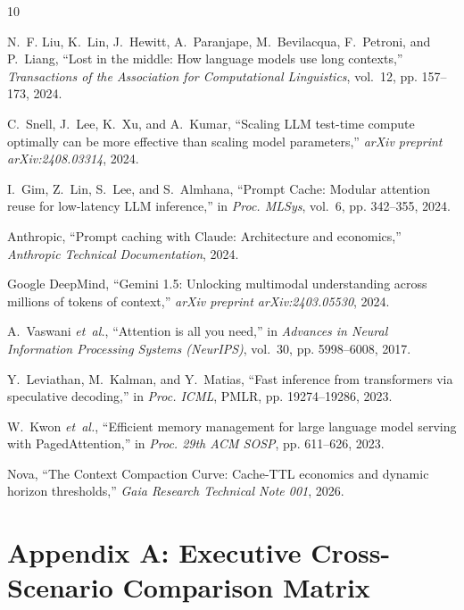\documentclass[10pt,twocolumn,a4paper]{article}
\begin{document}
\begin{thebibliography}{10}

N.~F. Liu, K.~Lin, J.~Hewitt, A.~Paranjape, M.~Bevilacqua, F.~Petroni, and P.~Liang,
``Lost in the middle: How language models use long contexts,''
\emph{Transactions of the Association for Computational Linguistics}, vol.~12, pp. 157--173, 2024.

C.~Snell, J.~Lee, K.~Xu, and A.~Kumar,
``Scaling LLM test-time compute optimally can be more effective than scaling model parameters,''
\emph{arXiv preprint arXiv:2408.03314}, 2024.

I.~Gim, Z.~Lin, S.~Lee, and S.~Almhana,
``Prompt Cache: Modular attention reuse for low-latency LLM inference,''
in \emph{Proc. MLSys}, vol.~6, pp. 342--355, 2024.

Anthropic,
``Prompt caching with Claude: Architecture and economics,''
\emph{Anthropic Technical Documentation}, 2024.

Google DeepMind,
``Gemini 1.5: Unlocking multimodal understanding across millions of tokens of context,''
\emph{arXiv preprint arXiv:2403.05530}, 2024.

A.~Vaswani \emph{et~al.},
``Attention is all you need,''
in \emph{Advances in Neural Information Processing Systems (NeurIPS)}, vol.~30, pp. 5998--6008, 2017.

Y.~Leviathan, M.~Kalman, and Y.~Matias,
``Fast inference from transformers via speculative decoding,''
in \emph{Proc. ICML}, PMLR, pp. 19274--19286, 2023.

W.~Kwon \emph{et~al.},
``Efficient memory management for large language model serving with PagedAttention,''
in \emph{Proc. 29th ACM SOSP}, pp. 611--626, 2023.

Nova,
``The Context Compaction Curve: Cache-TTL economics and dynamic horizon thresholds,''
\emph{Gaia Research Technical Note 001}, 2026.

\end{thebibliography}

\clearpage
\appendix

\section*{Appendix A: Executive Cross-Scenario Comparison Matrix}
\end{document}
